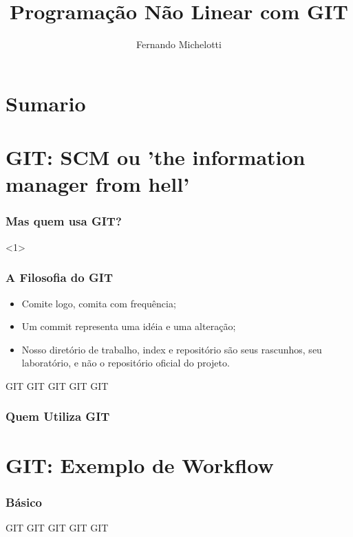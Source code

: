 \documentclass{beamer}
\author{Fernando Michelotti}
\title{Programação Não Linear com GIT}
\begin{document}
\frame{\titlepage}
\section{Sumario}

\frame{\tableofcontents}

\section{GIT: SCM ou 'the information manager from hell'}

\begin{frame}
\frametitle{Mas quem usa GIT?}

<1>

\end{frame}

\begin{frame}
\frametitle{A Filosofia do GIT}
\begin{itemize}
\item Comite logo, comita com frequência;
\item Um commit representa uma idéia e uma alteração;
\item Nosso diretório de trabalho, index e repositório são seus rascunhos, seu laboratório, e não o repositório oficial do projeto.
\end{itemize}
\end{frame}

\begin{frame}

\begin{block}{GIT}
GIT GIT GIT GIT
\frametitle{Quem Utiliza GIT}
\end{block}


\end{frame}

\section{GIT: Exemplo de Workflow}

\begin{frame}
\frametitle{Básico}

\begin{block}{GIT}
GIT GIT GIT GIT
\end{block}

\end{frame}



\end{document}
